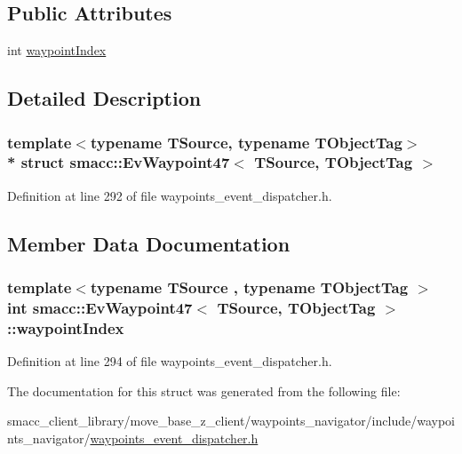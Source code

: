 \subsection*{Public Attributes}
\begin{DoxyCompactItemize}
\item 
int \hyperlink{structsmacc_1_1EvWaypoint47_a3cac062d8a0037af6ac1e991a7421df6}{waypoint\+Index}
\end{DoxyCompactItemize}


\subsection{Detailed Description}
\subsubsection*{template$<$typename T\+Source, typename T\+Object\+Tag$>$\\*
struct smacc\+::\+Ev\+Waypoint47$<$ T\+Source, T\+Object\+Tag $>$}



Definition at line 292 of file waypoints\+\_\+event\+\_\+dispatcher.\+h.



\subsection{Member Data Documentation}
\subsubsection[{\texorpdfstring{waypoint\+Index}{waypointIndex}}]{\setlength{\rightskip}{0pt plus 5cm}template$<$typename T\+Source , typename T\+Object\+Tag $>$ int {\bf smacc\+::\+Ev\+Waypoint47}$<$ T\+Source, T\+Object\+Tag $>$\+::waypoint\+Index}\hypertarget{structsmacc_1_1EvWaypoint47_a3cac062d8a0037af6ac1e991a7421df6}{}\label{structsmacc_1_1EvWaypoint47_a3cac062d8a0037af6ac1e991a7421df6}


Definition at line 294 of file waypoints\+\_\+event\+\_\+dispatcher.\+h.



The documentation for this struct was generated from the following file\+:\begin{DoxyCompactItemize}
\item 
smacc\+\_\+client\+\_\+library/move\+\_\+base\+\_\+z\+\_\+client/waypoints\+\_\+navigator/include/waypoints\+\_\+navigator/\hyperlink{waypoints__event__dispatcher_8h}{waypoints\+\_\+event\+\_\+dispatcher.\+h}\end{DoxyCompactItemize}
